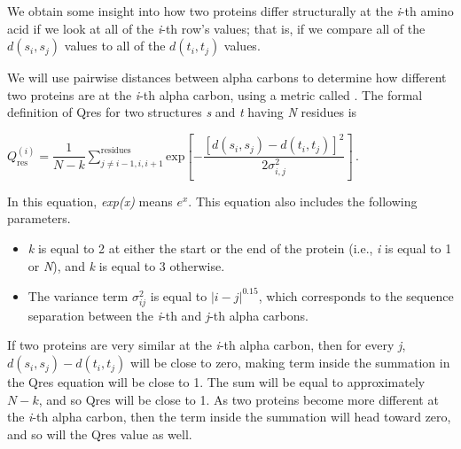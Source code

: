\begin{qbox}\end{qbox}

We obtain some insight into how two proteins differ structurally at the \textit{i}-th amino acid if we look at all of the \textit{i}-th row's values; that is, if we compare all of the $d(s_{i}, s_{j})$ values to all of the $d(t_{i}, t_{j})$ values.

We will use pairwise distances between alpha carbons to determine how different two proteins are at the \textit{i}-th alpha carbon, using a metric called .  The formal definition of Qres for two structures \textit{s} and \textit{t} having \textit{N} residues is

\begin{center}
$Q_{\text{res}}^{(i)} = \dfrac{1}{N-k} \sum^{\text{residues}}_{j\neq i-1,i,i+1} \textrm{exp}[-\dfrac{[d(s_i,s_j)-d(t_i,t_j)]^2}{2\sigma^2_{i,j}}]\, .$
\end{center}

In this equation, \textit{exp(x)} means $e^{x}$. This equation also includes the following parameters.

\begin{itemize}
	\item \textit{k} is equal to 2 at either the start or the end of the protein (i.e., \textit{i} is equal to 1 or \textit{N}), and \textit{k} is equal to 3 otherwise.
	\item The variance term $\sigma_{ij}^2$ is equal to $\left\lvert{i-j}\right\rvert ^{0.15}$, which corresponds to the sequence separation between the \textit{i}-th and \textit{j}-th alpha carbons.
\end{itemize}

\begin{note}\end{note}

If two proteins are very similar at the \textit{i}-th alpha carbon, then for every \textit{j}, $d(s_{i}, s_{j}) - d(t_{i}, t_{j})$ will be close to zero, making term inside the summation in the Qres equation will be close to 1. The sum will be equal to approximately $N - k$, and so Qres will be close to 1. As two proteins become more different at the \textit{i}-th alpha carbon, then the term inside the summation will head toward zero, and so will the Qres value as well.

